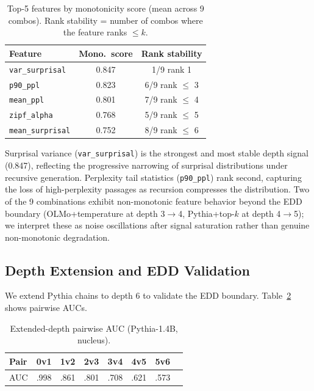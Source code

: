 \documentclass[11pt,a4paper]{article}
\begin{document}
\begin{table}[t]
\centering
\small
\caption{Top-5 features by monotonicity score (mean across 9 combos). Rank stability = number of combos where the feature ranks $\leq k$.}
\label{tab:monotonicity}
\begin{tabular}{@{}lcc@{}}
\toprule
\textbf{Feature} & \textbf{Mono.\ score} & \textbf{Rank stability} \\
\midrule
\texttt{var\_surprisal} & 0.847 & 1/9 rank 1 \\
\texttt{p90\_ppl} & 0.823 & 6/9 rank $\leq$ 3 \\
\texttt{mean\_ppl} & 0.801 & 7/9 rank $\leq$ 4 \\
\texttt{zipf\_alpha} & 0.768 & 5/9 rank $\leq$ 5 \\
\texttt{mean\_surprisal} & 0.752 & 8/9 rank $\leq$ 6 \\
\bottomrule
\end{tabular}
\end{table}

Surprisal variance (\texttt{var\_surprisal}) is the strongest and most stable depth signal (0.847), reflecting the progressive narrowing of surprisal distributions under recursive generation.
Perplexity tail statistics (\texttt{p90\_ppl}) rank second, capturing the loss of high-perplexity passages as recursion compresses the distribution.
Two of the 9 combinations exhibit non-monotonic feature behavior beyond the EDD boundary (OLMo+temperature at depth 3$\to$4, Pythia+top-$k$ at depth 4$\to$5); we interpret these as noise oscillations after signal saturation rather than genuine non-monotonic degradation.

\subsection{Depth Extension and EDD Validation}
\label{sec:extension}

We extend Pythia chains to depth 6 to validate the EDD boundary.
Table~\ref{tab:extension} shows pairwise AUCs.

\begin{table}[t]
\centering
\small
\caption{Extended-depth pairwise AUC (Pythia-1.4B, nucleus).}
\label{tab:extension}
\begin{tabular}{@{}lccccccc@{}}
\toprule
\textbf{Pair} & 0v1 & 1v2 & 2v3 & 3v4 & 4v5 & 5v6 \\
\midrule
AUC & .998 & .861 & .801 & .708 & .621 & .573 \\
\bottomrule
\end{tabular}
\end{table}
\end{document}
